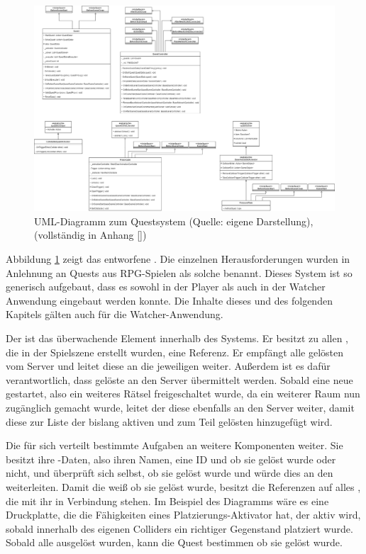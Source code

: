 \begin{figure}[ht]
\centering
\includegraphics[width=1\linewidth]{content/pictures/QuestSystem.drawio.png}
\caption{UML-Diagramm zum Questsystem (Quelle: eigene Darstellung), (vollständig in Anhang \ref{})}
\label{fig:quest-system-uml}
\end{figure}

Abbildung \ref{fig:quest-system-uml} zeigt das entworfene . Die einzelnen Herausforderungen wurden in Anlehnung an Quests aus \ac{RPG}-Spielen als solche benannt. Dieses System ist so generisch aufgebaut, dass es sowohl in der Player als auch in der Watcher Anwendung eingebaut werden konnte. Die Inhalte dieses und des folgenden Kapitels gälten auch für die Watcher-Anwendung.

Der  ist das überwachende Element innerhalb des Systems. Er besitzt zu allen , die in der Spielszene erstellt wurden, eine Referenz. Er empfängt alle gelösten  vom Server und leitet diese an die jeweiligen  weiter. Außerdem ist es dafür verantwortlich, dass gelöste  an den Server übermittelt werden. Sobald eine neue  gestartet, also ein weiteres Rätsel freigeschaltet wurde, da ein weiterer Raum nun zugänglich gemacht wurde, leitet der  diese ebenfalls an den Server weiter, damit diese zur Liste der bislang aktiven und zum Teil gelösten  hinzugefügt wird.

Die  für sich verteilt bestimmte Aufgaben an weitere Komponenten weiter. Sie besitzt ihre -Daten, also ihren Namen, eine ID und ob sie gelöst wurde oder nicht, und überprüft sich selbst, ob sie gelöst wurde und würde dies an den  weiterleiten. Damit die  weiß ob sie gelöst wurde, besitzt die Referenzen auf alles , die mit ihr in Verbindung stehen. Im Beispiel des Diagramms wäre es eine Druckplatte, die die Fähigkeiten eines Platzierungs-Aktivator hat, der aktiv wird, sobald innerhalb des eigenen Colliders ein richtiger Gegenstand platziert wurde. Sobald alle  ausgelöst wurden, kann die Quest bestimmen ob sie gelöst wurde. 

